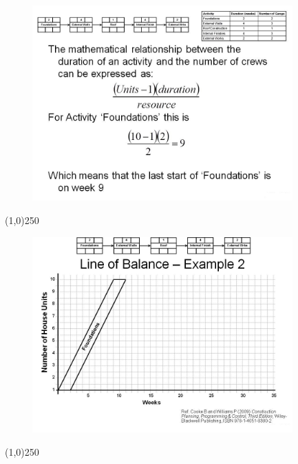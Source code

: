 \begin{frame}
\begin{figure}
	\centering
		\includegraphics[width = 10.0cm]{oldnotes/Slide257.jpg}
\end{figure}
\end{frame}
\begin{center}\line(1,0){250}\end{center}






\begin{frame}
\begin{figure}
	\centering
		\includegraphics[width = 10.0cm]{oldnotes/Slide258.jpg}
\end{figure}
\end{frame}
\begin{center}\line(1,0){250}\end{center}







